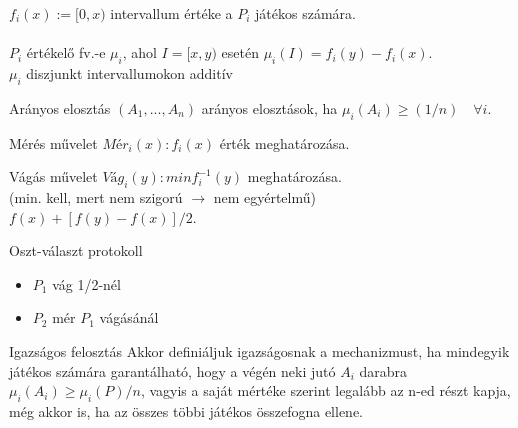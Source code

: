 	$f_i(x):=[0,x)$ intervallum értéke a $P_i$ játékos számára.\\ 
	\\
	$P_i$ értékelő fv.-e $\mu_i$, ahol $I = [x,y)$ esetén $\mu_i(I) = f_i(y) - f_i(x)$. \\
	$\mu_i$ diszjunkt intervallumokon additív 
	
	\begin{definition}{Arányos elosztás}{}
		$(A_1, ..., A_n)$ arányos elosztások, ha $\mu_i(A_i) \geq (1/n) \quad \forall i $.
	\end{definition} 
	
	\begin{definition}{Mérés művelet}{}
		$Mér_i(x): f_i(x)$ érték meghatározása.
	\end{definition}
	
	\begin{definition}{Vágás művelet}{}
		$Vág_i(y): minf_i^{-1}(y)$ meghatározása.\\
		 (min. kell, mert nem szigorú $\rightarrow$ nem egyértelmű) \\
		$f(x) + [f(y)-f(x)]/2$.
	\end{definition}
	
	\begin{definition}{Oszt-választ protokoll}{}
		\begin{itemize}
			\item $P_1$ vág 1/2-nél 
			\item $P_2$ mér $P_1$ vágásánál
		\end{itemize}
	\end{definition}
	
	\begin{definition}{Igazságos felosztás}{}
		Akkor definiáljuk igazságosnak a mechanizmust, ha mindegyik
		játékos számára garantálható, hogy a végén neki jutó $A_i$ darabra $\mu_i(A_i) \geq \mu_i(P)/n$, vagyis a saját
		mértéke szerint legalább az n-ed részt kapja, még akkor is, ha az összes többi játékos összefogna
		ellene. 
	\end{definition}
	
